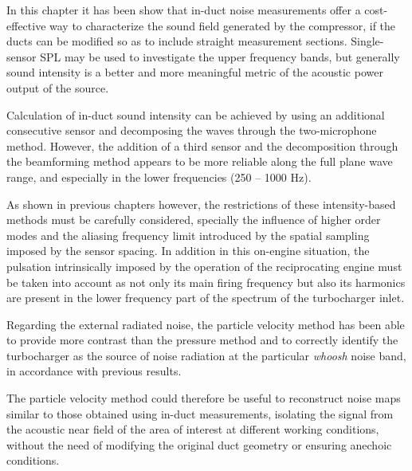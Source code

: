 In this chapter it has been show that in-duct noise measurements offer a cost-effective way to characterize the sound field generated by the compressor, if the ducts can be modified so as to include straight measurement sections. Single-sensor SPL may be used to investigate the upper frequency bands, but generally sound intensity is a better and more meaningful metric of the acoustic power output of the source.

Calculation of in-duct sound intensity can be achieved by using an additional consecutive sensor and decomposing the waves through the two-microphone method. However, the addition of a third sensor and the decomposition through the beamforming method appears to be more reliable along the full plane wave range, and especially in the lower frequencies (250 -- 1000 Hz).

As shown in previous chapters however, the restrictions of these intensity-based methods must be carefully considered, specially the influence of higher order modes and the aliasing frequency limit introduced by the spatial sampling imposed by the sensor spacing. In addition in this on-engine situation, the pulsation intrinsically imposed by the operation of the reciprocating engine must be taken into account as not only its main firing frequency but also its harmonics are present in the lower frequency part of the spectrum of the turbocharger inlet.

Regarding the external radiated noise, the particle velocity method has been able to provide more contrast than the pressure method and to correctly identify the turbocharger as the source of noise radiation at the particular \emph{whoosh} noise band, in accordance with previous results.

The particle velocity method could therefore be useful to reconstruct noise maps similar to those obtained using in-duct measurements, isolating the signal from the acoustic near field of the area of interest at different working conditions, without the need of modifying the original duct geometry or ensuring anechoic conditions.
